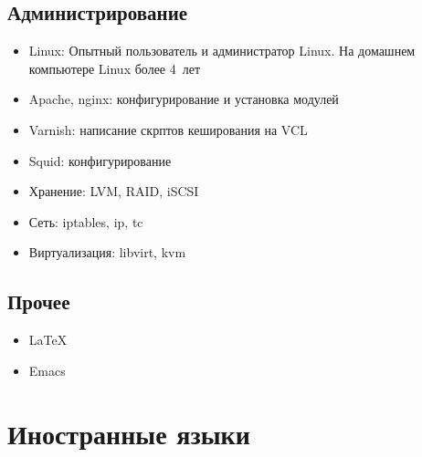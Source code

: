 \documentclass[11pt,a4paper,sans]{moderncv}        %
\begin{document}
\subsection{Администрирование}

\begin{itemize}
\item Linux: Опытный пользователь и администратор Linux.  На домашнем
  компьютере Linux более \hbox{4 лет}
\item Apache, nginx: конфигурирование и установка модулей
\item Varnish: написание скрптов кеширования на VCL
\item Squid: конфигурирование
\item Хранение: LVM, RAID, iSCSI
\item Сеть: iptables, ip, tc
\item Виртуализация: libvirt, kvm
\end{itemize}

\subsection{Прочее}

\begin{itemize}
\item \LaTeX
\item Emacs
\end{itemize}

\section{Иностранные языки}


\nocite{*}

\end{document}
